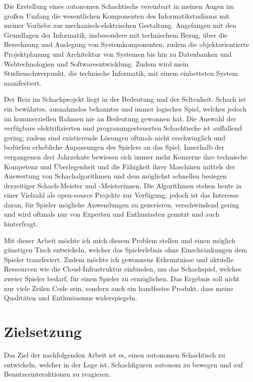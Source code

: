 Die Erstellung eines autonomen Schachtischs vereinbart in meinen Augen
im großen Umfang die wesentlichen Komponenten des Informatikstudiums mit
meiner Vorliebe zur mechanisch-elektrischen Gestaltung. Angefangen mit
den Grundlagen der Informatik, insbesondere mit technischem Bezug, über
die Berechnung und Auslegung von Systemkomponenten, zudem die
objektorientierte Projektplanung und Architektur von Systemen bis hin zu
Datenbanken und Webtechnologien und Softwareentwicklung. Zudem wird mein
Studienschwerpunkt, die technische Informatik, mit einem einbetteten
System manifestiert.

Der Reiz im Schachprojekt liegt in der Bedeutung und der Seltenheit.
Schach ist ein bewährtes, ausnahmslos bekanntes und immer logisches
Spiel, welches jedoch im kommerziellen Rahmen nie an Bedeutung gewonnen
hat. Die Auswahl der verfügbare elektrifizierten und programmgesteuerten
Schachtische ist auffallend gering; zudem sind existierende Lösungen
oftmals nicht erschwinglich und bedürfen erhebliche Anpassungen des
Spielers an das Spiel. Innerhalb der vergangenen drei Jahrzehnte
bewiesen sich immer mehr Konzerne ihre technische Kompetenz und
Überlegenheit und die Fähigkeit ihrer Maschinen mittels der Auswertung
von Schachalgorithmen und dem möglichst schnellen besiegen derzeitiger
Schach-Meister und -Meisterinnen. Die Algorithmen stehen heute in einer
Vielzahl als open-source Projekte zur Verfügung, jedoch ist das
Interesse daran, für Spieler mögliche Anwendungen zu generieren,
verschwindend gering und wird oftmals nur von Experten und Enthusiasten
genutzt und auch hinterfragt.

Mit dieser Arbeit möchte ich mich diesem Problem stellen und einen
möglich günstigen Tisch entwickeln, welcher das Spielerlebnis ohne
Einschränkungen dem Spieler transferiert. Zudem möchte ich gewonnene
Erkenntnisse und aktuelle Ressourcen wie die Cloud-Infrastruktur
einbinden, um das Schachspiel, welches zweier Spieler bedarf, für einen
Spieler zu ermöglichen. Das Ergebnis soll nicht nur viele Zeilen Code
sein, sondern auch ein handfestes Produkt, dass meine Qualitäten und
Enthusiasmus widerspiegeln.

\hypertarget{zielsetzung}{%
\section{Zielsetzung}\label{zielsetzung}}

Das Ziel der nachfolgenden Arbeit ist es, einen autonomen Schachtisch zu
entwickeln, welcher in der Lage ist, Schachfiguren autonom zu bewegen
und auf Benutzerinteraktionen zu reagieren.

